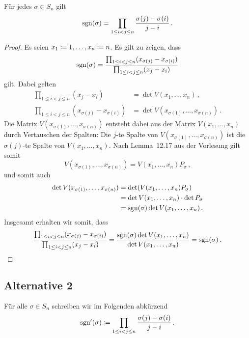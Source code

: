 \begin{theorem}
  \label{theorem: sign formula}
  Für jedes $\sigma \in S_n$ gilt
  \[
      \operatorname{sgn}(\sigma)
    = \prod_{1 \leq i < j \leq n} \frac{\sigma(j) - \sigma(i)}{j - i} \,.
  \]
\end{theorem}

\begin{proof}
  Es seien $x_1 \coloneqq 1, \dotsc, x_n \coloneqq n$.
  Es gilt zu zeigen, dass
  \[
      \operatorname{sgn}(\sigma)
    = \frac{\prod_{1 \leq i < j \leq n} (x_{\sigma(j)} - x_{\sigma(i)})}{\prod_{1 \leq i < j \leq n} (x_j - x_i)}
  \]
  gilt.
  Dabei gelten
  \begin{align*}
        \prod_{1 \leq i < j \leq n} (x_j - x_i)
    &=  \det V(x_1, \dotsc, x_n) \,,
    \\
        \prod_{1 \leq i < j \leq n} (x_{\sigma(j)} - x_{\sigma(i)})
    &=  \det V(x_{\sigma(1)}, \dotsc, x_{\sigma(n)}) \,.
  \end{align*}
  Die Matrix $V(x_{\sigma(1)}, \dotsc, x_{\sigma(n)})$ entsteht dabei aus der Matrix $V(x_1, \dotsc, x_n)$ durch Vertauschen der Spalten:
  Die $j$-te Spalte von $V(x_{\sigma(1)}, \dotsc, x_{\sigma(n)})$ ist die $\sigma(j)$-te Spalte von $V(x_1, \dotsc, x_n)$.
  Nach Lemma~12.17 aus der Vorlesung gilt somit
  \[
      V(x_{\sigma(1)}, \dotsc, x_{\sigma(n)})
    = V(x_1, \dotsc, x_n) P_{\sigma} \,,
  \]
  und somit auch
  \begin{align*}
        \det V(x_{\sigma(1)}, \dotsc, x_{\sigma(n)})
    &=  \det( V(x_1, \dotsc, x_n) P_\sigma )  \\
    &=  \det V(x_1, \dotsc, x_n) \cdot \det P_{\sigma}  \\
    &=  \operatorname{sgn}(\sigma) \det V(x_1, \dotsc, x_n) \,.
  \end{align*}
  Insgesamt erhalten wir somit, dass
  \[
      \frac{\prod_{1 \leq i < j \leq n} (x_{\sigma(j)} - x_{\sigma(i)})}{\prod_{1 \leq i < j \leq n} (x_j - x_i)}
    = \frac{\operatorname{sgn}(\sigma) \det V(x_1, \dotsc, x_n)}{\det V(x_1, \dotsc, x_n)}
    = \operatorname{sgn}(\sigma) \,.
  \]
\end{proof}





\subsection*{Alternative 2}

Für alle $\sigma \in S_n$ schreiben wir im Folgenden abkürzend
\[
            \operatorname{sgn}'(\sigma)
  \coloneqq  \prod_{1 \leq i < j \leq n} \frac{\sigma(j) - \sigma(i)}{j - i} \,.
\]




